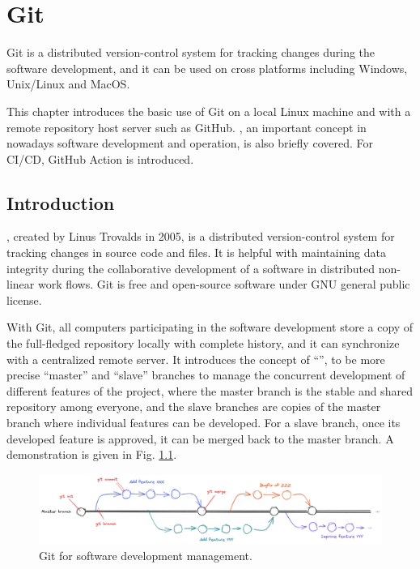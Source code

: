 \chapter{Git}

Git is a distributed version-control system for tracking changes during the software development, and it can be used on cross platforms including Windows, Unix/Linux and MacOS. 

This chapter introduces the basic use of Git on a local Linux machine and with a remote repository host server such as GitHub. , an important concept in nowadays software development and operation, is also briefly covered. For CI/CD, GitHub Action is introduced.

\section{Introduction}

, created by Linus Trovalds in 2005, is a distributed version-control system for tracking changes in source code and files. It is helpful with maintaining data integrity during the collaborative development of a software in distributed non-linear work flows. Git is free and open-source software under GNU general public license.

With Git, all computers participating in the software development store a copy of the full-fledged repository locally with complete history, and it can synchronize with a centralized remote server. It introduces the concept of ``'', to be more precise ``master'' and ``slave'' branches to manage the concurrent development of different features of the project, where the master branch is the stable and shared repository among everyone, and the slave branches are copies of the master branch where individual features can be developed. For a slave branch, once its developed feature is approved, it can be merged back to the master branch. A demonstration is given in Fig. \ref{ch:sma:fig:gitflow}.
\begin{figure}[htbp]
	\centering
	\includegraphics[width=350pt]{chapters/part-3/figures/gitflow.png}
	\caption{Git for software development management.} \label{ch:sma:fig:gitflow}
\end{figure}

